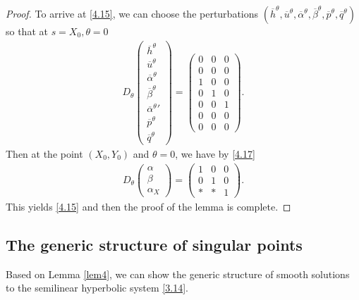 \documentclass[11pt,reqno]{article}
\numberwithin{equation}{section}
\begin{document}
\begin{proof}
To arrive at \eqref{4.15}, we can choose the perturbations $(\overline{h}^\theta, \overline{u}^\theta, \overline{\alpha}^\theta, \overline{\beta}^\theta, \overline{p}^\theta, \overline{q}^\theta)$ so that at $s=X_0, \theta=0$
\begin{align*}
D_\theta
\left(
\begin{array}{c}
\overline{h}^\theta \\
\overline{u}^\theta \\
\overline{\alpha}^\theta \\
\overline{\beta}^\theta \\
{\overline{\alpha}^{\theta}}' \\
\overline{p}^\theta \\
\overline{q}^\theta
\end{array}
\right)=
\left(
\begin{array}{ccc}
0 & 0 & 0 \\
0 & 0 & 0 \\
1 & 0 & 0 \\
0 & 1 & 0 \\
0 & 0 & 1 \\
0 & 0 & 0 \\
0 & 0 & 0
\end{array}
\right).
\end{align*}
Then at the point $(X_0, Y_0)$ and $\theta=0$, we have by \eqref{4.17}
\begin{align*}
D_\theta
\left(
\begin{array}{c}
\alpha \\
\beta \\
\alpha_{X}
\end{array}
\right)
=\left(
\begin{array}{ccc}
1 & 0 & 0 \\
0 & 1 & 0 \\
* & * & 1
\end{array}
\right).
\end{align*}
This yields \eqref{4.15} and then the proof of the lemma is complete.
\end{proof}



\subsection{The generic structure of singular points}\label{S43}

Based on Lemma \ref{lem4}, we can show the generic structure of smooth solutions to the semilinear hyperbolic system \eqref{3.14}.
\end{document}
